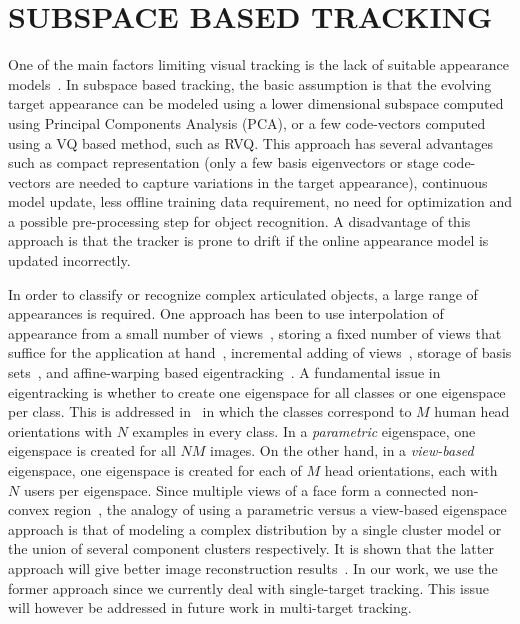 \documentclass{article}
\begin{document}
\section{SUBSPACE BASED TRACKING}
One of the main factors limiting visual tracking is the lack of suitable appearance models~\cite{2003_JNL_TRKsubspace_Jepson}.  In subspace based tracking, the basic assumption is that the evolving target appearance can be modeled using a lower dimensional subspace computed using Principal Components Analysis (PCA), or a few code-vectors computed using a VQ based method, such as RVQ.  This approach has several advantages such as compact representation (only a few basis eigenvectors or stage code-vectors are needed to capture variations in the target appearance), continuous model update, less offline training data requirement, no need for optimization and a possible pre-processing step for object recognition.  A disadvantage of this approach is that the tracker is prone to drift if the online appearance model is updated incorrectly. 

In order to classify or recognize complex articulated objects, a large range of appearances is required.  One approach has been to use interpolation of appearance from a small number of views~\cite{1991_JNL_Recog_Ullman}, storing a fixed number of views that suffice for the application at hand~\cite{1992_JNL_VBR_Breuel}, incremental adding of views~\cite{1993_CNF_Gestures_Darrell}, storage of basis sets~\cite{1996_TRK_region_Hager}, and affine-warping based eigentracking~\cite{1998_JNL_Eigentracking_Black}.  A fundamental issue in eigentracking is whether to create one eigenspace for all classes or one eigenspace per class.  This is addressed in~\cite{1997_JNL_EigenTRK_Moghaddam} in which the classes correspond to $M$ human head orientations with $N$ examples in every class.  In a \emph{parametric} eigenspace, one eigenspace is created for all $NM$ images.  On the other hand, in a \emph{view-based} eigenspace, one eigenspace is created for each of $M$ head orientations, each with $N$ users per eigenspace.  Since multiple views of a face form a connected non-convex region~\cite{1994_JNL_FaceTop_Bichsel}, the analogy of using a parametric versus a view-based eigenspace approach is that of modeling a complex distribution by a single cluster model or the union of several component clusters respectively.  It is shown that the latter approach will give better image reconstruction results~\cite{1997_JNL_EigenTRK_Moghaddam}.  In our work, we use the former approach since we currently deal with single-target tracking.  This issue will however be addressed in future work in multi-target tracking.
\end{document}

